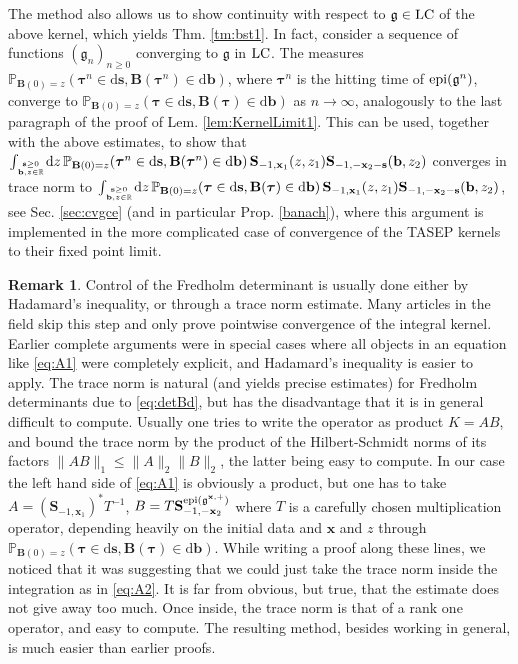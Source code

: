 \documentclass[letterpaper,reqno,11pt,oneside,final]{amsart}
\theoremstyle{definition}
\newtheorem{rem}[thm]{Remark}
\newcommand{\fg}{\mathfrak{g}}
\newcommand{\fb}{\mathbf{b}}
\newcommand{\pp}{\mathbb{P}}
\newcommand{\rr}{\mathbb{R}}
\newcommand{\uptext}[1]{\text{\upshape{#1}}}
\DeclareMathOperator{\epi}{\uptext{epi}}
\DeclareMathOperator{\LC}{\uptext{LC}}
\renewcommand{\d}{\mathrm{d}}
\newcommand{\fT}{\mathbf{S}}
\newcommand{\fs}{\mathbf{s}}
\newcommand{\fx}{\mathbf{x}}
\newcommand{\fB}{\mathbf{B}}
\newcommand{\ftau}{\bm{\tau}}
\numberwithin{equation}{section}
\begin{document}
The method also allows us to show continuity with respect to $\fg\in\LC$ of the above kernel, which yields Thm. \ref{tm:bst1}.
In fact, consider a sequence of functions $(\fg_n)_{n\geq0}$ converging to $\fg$ in $\LC$.
The measures $\pp_{\fB(0)=z}(\ftau^n\in\d\fs,\fB(\ftau^n )\in\d\fb)$, where $\ftau^n$ is the hitting time of $\epi(\fg^n)$, converge to $\pp_{\fB(0)=z}(\ftau\in\d\fs,\fB(\ftau)\in\d\fb)$ as $n\to\infty$, analogously to the last paragraph of the proof of Lem. \ref{lem:KernelLimit1}.
This can be used, together with the above estimates, to show that $\int_{\fs\geq0\atop\fb,z\in\rr}\!\d z\,\pp_{\fB(0)=z}(\ftau^n\in\d\fs,\fB(\ftau^n )\in\d\fb)\,\fT_{-1,\fx_1}(z,z_1)\fT_{-1,-\fx_2-\fs}(\fb,z_2)$ converges in trace norm to $ \int_{\fs\geq0\atop\fb,z\in\rr}\!\d z\,\pp_{\fB(0)=z}(\ftau\in\d\fs,\fB(\ftau)\in\d\fb)\,\fT_{-1,\fx_1}(z,z_1)\fT_{-1,-\fx_2-\fs}(\fb,z_2)$, see Sec. \ref{sec:cvgce} (and in particular Prop. \ref{banach}), where this argument is implemented in the more complicated case of convergence of the TASEP kernels to their fixed point limit.

\begin{rem}\label{rem:AB}
Control of the Fredholm determinant is usually done either by Hadamard's inequality, or through a trace norm estimate.
Many articles in the field skip this step and only prove pointwise convergence of the integral kernel.
Earlier complete arguments were in special cases where all objects in an equation like \eqref{eq:A1} were completely explicit, and Hadamard's inequality is easier to apply.
The trace norm is natural (and yields precise estimates) for Fredholm determinants due to \eqref{eq:detBd}, but has the disadvantage that it is in general difficult to compute.
Usually one tries to write the operator as product $K=AB$, and bound the trace norm by the product of the Hilbert-Schmidt norms of its factors $\|AB\|_1\le \|A\|_2\|B\|_2$, the latter being easy to compute.
In our case the left hand side of \eqref{eq:A1} is obviously a product, but one has to take $A= (\fT_{-1,\fx_1} )^* T^{-1}$, $B=T \fT^{\epi(\fg^{\fx,+})}_{-1,-\fx_2}$ where $T$ is a carefully chosen multiplication operator, depending heavily on the initial data and $\fx$ and $z$ through $\pp_{\fB(0)=z}(\ftau\in\d\fs,\fB(\ftau)\in\d\fb)$.
While writing a proof along these lines, we noticed that it was suggesting that we could just take the trace norm inside the integration as in \eqref{eq:A2}.  It is far from obvious, but true, that the estimate does not give away too much.  Once inside, the trace norm is that of a rank one operator, and easy to compute.  The resulting method, besides working in general, is much easier than earlier proofs.
\end{rem}
\end{document}
